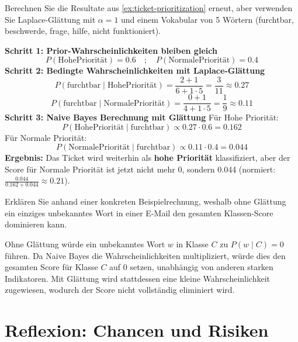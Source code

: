 \begin{mychallenge}
    Berechnen Sie die Resultate aus \cref{ex:ticket-prioritization} erneut, aber verwenden Sie Laplace-Glättung mit $\alpha=1$ und einem Vokabular von 5 Wörtern (furchtbar, beschwerde, frage, hilfe, nicht funktioniert).
    \begin{myanswer}
        \textbf{Schritt 1: Prior-Wahrscheinlichkeiten bleiben gleich}
        \[
            P(\text{HohePriorität}) = 0.6 \quad ; \quad P(\text{NormalePriorität}) = 0.4
        \]
        \textbf{Schritt 2: Bedingte Wahrscheinlichkeiten mit Laplace-Glättung}
        \[
            P(\text{furchtbar}\mid\text{HohePriorität}) = \frac{2 + 1}{6 + 1 \cdot 5} = \frac{3}{11} \approx 0.27
        \]
        \[
            P(\text{furchtbar}\mid\text{NormalePriorität}) = \frac{0 + 1}{4 + 1 \cdot 5} = \frac{1}{9} \approx 0.11
        \]
        \textbf{Schritt 3: Naive Bayes Berechnung mit Glättung}
        Für Hohe Priorität:
        \[
            P(\text{HohePriorität}\mid\text{furchtbar}) \propto 0.27 \cdot 0.6 = 0.162
        \]
        Für Normale Priorität:
        \[
            P(\text{NormalePriorität}\mid\text{furchtbar}) \propto 0.11 \cdot 0.4 = 0.044
        \]
        \textbf{Ergebnis:} Das Ticket wird weiterhin als \textbf{hohe Priorität} klassifiziert, aber der Score für Normale Priorität ist jetzt nicht mehr 0, sondern 0.044 (normiert: $\frac{0.044}{0.162 + 0.044} \approx 0.21$).
    \end{myanswer}
\end{mychallenge}

\begin{myexercise}
    Erklären Sie anhand einer konkreten Beispielrechnung, weshalb ohne Glättung ein einziges unbekanntes Wort
    in einer E-Mail den gesamten Klassen-Score dominieren kann.
    \begin{myanswer}
        Ohne Glättung würde ein unbekanntes Wort $w$ in Klasse $C$ zu $P(w\mid C)=0$ führen. Da Naive Bayes die Wahrscheinlichkeiten multipliziert, würde dies den gesamten Score für Klasse $C$ auf 0 setzen, unabhängig von anderen starken Indikatoren. Mit Glättung wird stattdessen eine kleine Wahrscheinlichkeit zugewiesen, wodurch der Score nicht vollständig eliminiert wird.
    \end{myanswer}
\end{myexercise}

\section{Reflexion: Chancen und Risiken}

